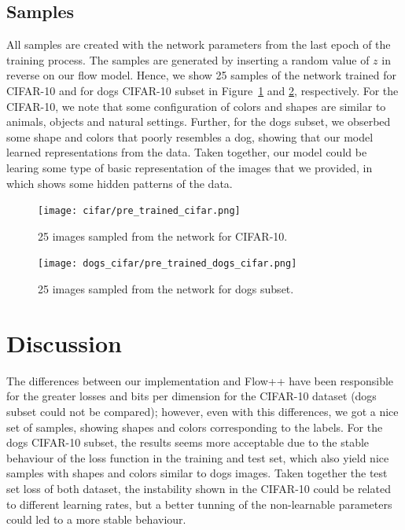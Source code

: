 \documentclass{article}
\begin{document}
\subsection{Samples}

All samples are created with the network parameters from the last epoch of the training process. The samples are generated by inserting a random value of $z$ in reverse on our flow model. Hence, we show 25 samples of the network trained for CIFAR-10 and for dogs CIFAR-10 subset in Figure~\ref{fig:netSample} and \ref{fig:dogsNetSample}, respectively. For the CIFAR-10, we note that some configuration of colors and shapes are similar to animals, objects and natural settings. Further, for the dogs subset, we obserbed some shape and colors that poorly resembles a dog, showing that our model learned representations from the data. Taken together, our model could be learing some type of basic representation of the images that we provided, in which shows some hidden patterns of the data.


\begin{figure}
  \centering
  \texttt{[image: cifar/pre\_trained\_cifar.png]}
  \caption{25 images sampled from the network for CIFAR-10.}
  \label{fig:netSample}
\end{figure}

\begin{figure}
  \centering
  \texttt{[image: dogs\_cifar/pre\_trained\_dogs\_cifar.png]}
  \caption{25 images sampled from the network for dogs subset.}
  \label{fig:dogsNetSample}
\end{figure}

\section{Discussion}

The differences between our implementation and Flow++ have been responsible for the greater losses and bits per dimension for the CIFAR-10 dataset (dogs subset could not be compared); however, even with this differences, we got a nice set of samples, showing shapes and colors corresponding to the labels. For the dogs CIFAR-10 subset, the results seems more acceptable due to the stable behaviour of the loss function in the training and test set, which also yield nice samples with shapes and colors similar to dogs images. Taken together the test set loss of both dataset, the instability shown in the CIFAR-10 could be related to different learning rates, but a better tunning of the non-learnable parameters could led to a more stable behaviour.
\end{document}
